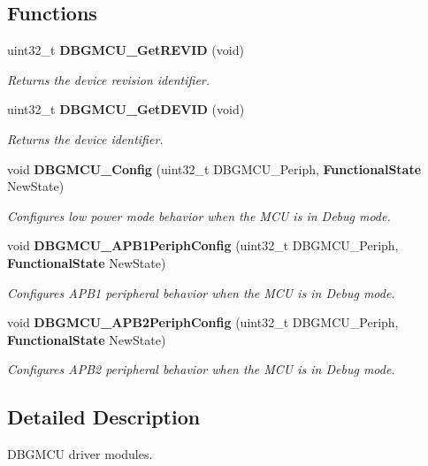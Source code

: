 \subsection*{Functions}
\begin{DoxyCompactItemize}
\item 
uint32\+\_\+t \textbf{ D\+B\+G\+M\+C\+U\+\_\+\+Get\+R\+E\+V\+ID} (void)
\begin{DoxyCompactList}\small\item\em Returns the device revision identifier. \end{DoxyCompactList}\item 
uint32\+\_\+t \textbf{ D\+B\+G\+M\+C\+U\+\_\+\+Get\+D\+E\+V\+ID} (void)
\begin{DoxyCompactList}\small\item\em Returns the device identifier. \end{DoxyCompactList}\item 
void \textbf{ D\+B\+G\+M\+C\+U\+\_\+\+Config} (uint32\+\_\+t D\+B\+G\+M\+C\+U\+\_\+\+Periph, \textbf{ Functional\+State} New\+State)
\begin{DoxyCompactList}\small\item\em Configures low power mode behavior when the M\+CU is in Debug mode. \end{DoxyCompactList}\item 
void \textbf{ D\+B\+G\+M\+C\+U\+\_\+\+A\+P\+B1\+Periph\+Config} (uint32\+\_\+t D\+B\+G\+M\+C\+U\+\_\+\+Periph, \textbf{ Functional\+State} New\+State)
\begin{DoxyCompactList}\small\item\em Configures A\+P\+B1 peripheral behavior when the M\+CU is in Debug mode. \end{DoxyCompactList}\item 
void \textbf{ D\+B\+G\+M\+C\+U\+\_\+\+A\+P\+B2\+Periph\+Config} (uint32\+\_\+t D\+B\+G\+M\+C\+U\+\_\+\+Periph, \textbf{ Functional\+State} New\+State)
\begin{DoxyCompactList}\small\item\em Configures A\+P\+B2 peripheral behavior when the M\+CU is in Debug mode. \end{DoxyCompactList}\end{DoxyCompactItemize}


\subsection{Detailed Description}
D\+B\+G\+M\+CU driver modules. 



